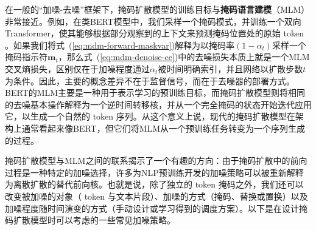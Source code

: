 在一般的“加噪-去噪”框架下，掩码扩散模型的训练目标与\textbf{掩码语言建模}（MLM）非常接近。例如，在类BERT模型中，我们采样一个掩码模式，并训练一个双向Transformer，使其能够根据部分观察到的上下文来预测掩码位置处的原始 token \citep{devlin-etal:2019bert}。如果我们将式~(\ref{eq:mdm-forward-maskvar})解释为以掩码率$(1-\alpha_t)$采样一个掩码指示符$\mathbf{m}_t$，那么式~(\ref{eq:mdm-denoise-ce})中的去噪损失本质上就是一个MLM交叉熵损失，区别仅在于加噪程度通过$\alpha_t$被时间明确索引，并且网络以扩散步数$t$为条件。因此，主要的概念差异不在于监督信号，而在于去噪器的部署方式。BERT的MLM主要是一种用于表示学习的预训练目标，而掩码扩散模型则将相同的去噪基本操作解释为一个逆时间转移核，并从一个完全掩码的状态开始迭代应用它，以生成一个自然的 token 序列。从这个意义上说，现代的掩码扩散模型在架构上通常看起来像BERT，但它们将MLM从一个预训练任务转变为一个序列生成的过程。

掩码扩散模型与MLM之间的联系揭示了一个有趣的方向：由于掩码扩散中的前向过程是一种特定的加噪选择，许多为NLP预训练开发的加噪策略可以被重新解释为离散扩散的替代前向核。也就是说，除了独立的 token 掩码之外，我们还可以改变被加噪的对象（ token 与文本片段）、加噪的方式（掩码、替换或置换）以及加噪程度随时间演变的方式（手动设计或学习得到的调度方案）。以下是在设计掩码扩散模型时可以考虑的一些常见加噪策略。

